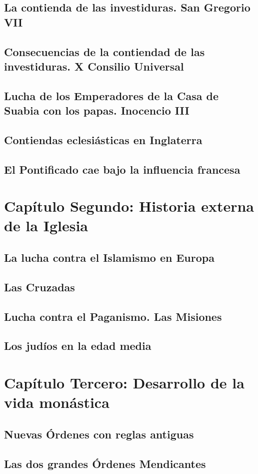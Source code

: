 \raggedbottom{} \documentclass[12pt, a4paper]{book}
\begin{document}
\section{La contienda de las investiduras. San Gregorio VII}
\section{Consecuencias de la contiendad de las investiduras. X Consilio Universal}
\section{Lucha de los Emperadores de la Casa de Suabia con los papas. Inocencio III}
\section{Contiendas eclesiásticas en Inglaterra}
\section{El Pontificado cae bajo la influencia francesa}
\chapter{Capítulo Segundo: Historia externa de  la Iglesia}
\section{La lucha contra el Islamismo en Europa}
\section{Las Cruzadas}
\section{Lucha contra el Paganismo. Las Misiones}
\section{Los judíos en la edad media}
\chapter{Capítulo Tercero: Desarrollo de la vida monástica}
\section{Nuevas Órdenes con reglas antiguas}
\section{Las dos grandes Órdenes Mendicantes}
\end{document}
